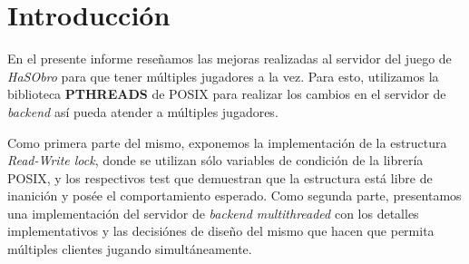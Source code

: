 \section{Introducción}

En el presente informe reseñamos las mejoras realizadas al servidor del juego de \textit{HaSObro} para que tener múltiples jugadores a la vez. Para esto, utilizamos la biblioteca \textbf{PTHREADS} de POSIX para realizar los cambios en el servidor de \textit{backend} así pueda atender a múltiples jugadores.

Como primera parte del mismo, exponemos la implementación de la estructura \textit{Read-Write lock}, donde se utilizan sólo variables de condición de la librería POSIX, y los respectivos test que demuestran que la estructura está libre de inanición y posée el comportamiento esperado. Como segunda parte, presentamos una implementación del servidor de \textit{backend multithreaded} con los detalles implementativos y las decisiónes de diseño del mismo que hacen que permita múltiples clientes jugando simultáneamente.